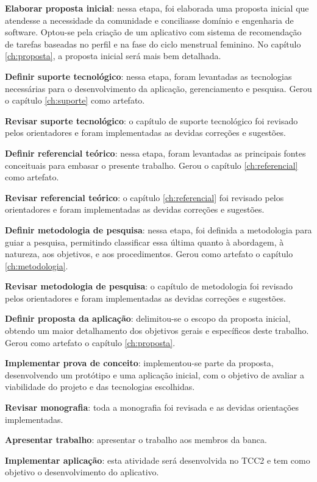 \textbf{Elaborar proposta inicial}: nessa etapa, foi elaborada uma proposta inicial que 
atendesse a necessidade da comunidade e conciliasse domínio e engenharia de software. 
Optou-se pela criação de um aplicativo com sistema de recomendação de tarefas baseadas no perfil e
na fase do ciclo menstrual feminino. No capítulo \ref{ch:proposta}, a proposta inicial será mais bem detalhada.

\textbf{Definir suporte tecnológico}: nessa etapa, foram levantadas as tecnologias necessárias para o desenvolvimento da aplicação, 
gerenciamento e pesquisa. Gerou o capítulo \ref{ch:suporte} como artefato.

\textbf{Revisar suporte tecnológico}: o capítulo de suporte tecnológico foi revisado pelos orientadores e foram implementadas as devidas correções e sugestões.

\textbf{Definir referencial teórico}: nessa etapa, foram levantadas as principais fontes conceituais para embasar o presente trabalho. Gerou o capítulo \ref{ch:referencial} como artefato.

\textbf{Revisar referencial teórico}: o capítulo \ref{ch:referencial} foi revisado pelos orientadores e foram implementadas as devidas correções e sugestões.

\textbf{Definir metodologia de pesquisa}: nessa etapa, foi definida a metodologia 
para guiar a pesquisa, permitindo classificar essa última quanto
à abordagem, à natureza, aos objetivos, e aos procedimentos. Gerou como artefato o capítulo \ref{ch:metodologia}.

\textbf{Revisar metodologia de pesquisa}: o capítulo de metodologia foi revisado pelos orientadores e foram implementadas as devidas correções e sugestões.

\textbf{Definir proposta da aplicação}: delimitou-se o escopo da proposta inicial, obtendo um maior detalhamento 
dos objetivos gerais e específicos deste trabalho. Gerou como artefato o capítulo \ref{ch:proposta}.

\textbf{Implementar prova de conceito}: implementou-se parte da proposta, desenvolvendo um protótipo e uma aplicação inicial, com o objetivo 
de avaliar a viabilidade do projeto e das tecnologias escolhidas.

\textbf{Revisar monografia}: toda a monografia foi revisada e as devidas orientações implementadas.
 
\textbf{Apresentar trabalho}: apresentar o trabalho aos membros da banca.

\textbf{Implementar aplicação}: esta atividade será desenvolvida no TCC2 e tem como objetivo 
o desenvolvimento do aplicativo.

